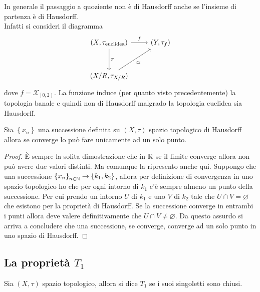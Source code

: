\begin{remark}
	In generale il passaggio a quoziente non è di Hausdorff anche se l'insieme di partenza è di Hausdorff. \\ Infatti si consideri il diagramma 
	\begin{equation*}
	\begin{tikzcd}[row sep = 3em]
	 (X, \tau_{\text{euclidea}}) \arrow{d}{\pi}\arrow{r}{f} & (Y, \tau_f)\\
	(X/R,\tau_{X/R}) \arrow[swap]{ru}{\simeq} &
	\end{tikzcd}
	\end{equation*}
	dove $f = \mathcal{X}_{\left[0,2\right)}$. La funzione induce (per quanto visto precedentemente) la topologia banale e quindi non di Hausdorff malgrado la topologia euclidea sia Hausdorff. 
\end{remark} 
\begin{theorem}
	Sia $\left\{x_n\right\}$ una successione definita su $(X, \tau)$ spazio topologico di Hausdorff allora se converge lo può fare unicamente ad un solo punto. 
\end{theorem} 
\begin{proof}
	È sempre la solita dimostrazione che in $\mathbb{R}$ se il limite converge allora non può avere due valori distinti. Ma comunque la ripresento anche qui. Suppongo che una successione $\left\{x_n\right\}_{n \in \mathbb{N}} \rightarrow \left\{k_1, k_2\right\}$, allora per definizione di convergenza in uno spazio topologico ho che per ogni intorno di $k_1$ c'è sempre almeno un punto della successione. Per cui prendo un intorno $U$ di $k_1$ e uno $V$ di $k_2$ tale che $U \cap V = \varnothing$ che esistono per la proprietà di Hausdorff. Se la successione converge in entrambi i punti allora deve valere definitivamente che $U \cap V \neq \varnothing$. Da questo assurdo si arriva a concludere che una successione, se converge, converge ad un solo punto in uno spazio di Hausdorff. 
\end{proof}



\subsection{\textcolor{TopGener}{\textbf{La proprietà $T_1$}}}



\begin{definition}
	Sia $(X, \tau)$ spazio topologico, allora si dice \textbf{$T_1$} se i suoi singoletti sono chiusi. 
\end{definition}

